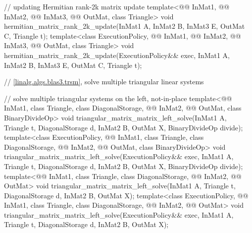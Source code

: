 \begin{codeblock}
{  // updating Hermitian rank-2k matrix update
  template<@@ InMat1, @@ InMat2, @@ InMat3,
           @@ OutMat, class Triangle>
    void hermitian_matrix_rank_2k_update(InMat1 A, InMat2 B, InMat3 E, OutMat C, Triangle t);
  template<class ExecutionPolicy,
           @@ InMat1, @@ InMat2, @@ InMat3,
           @@ OutMat, class Triangle>
    void hermitian_matrix_rank_2k_update(ExecutionPolicy&& exec,
                                         InMat1 A, InMat2 B, InMat3 E, OutMat C, Triangle t);

  // \ref{linalg.algs.blas3.trsm}, solve multiple triangular linear systems

  // solve multiple triangular systems on the left, not-in-place
  template<@@ InMat1, class Triangle, class DiagonalStorage,
           @@ InMat2, @@ OutMat, class BinaryDivideOp>
    void triangular_matrix_matrix_left_solve(InMat1 A, Triangle t, DiagonalStorage d,
                                             InMat2 B, OutMat X, BinaryDivideOp divide);
  template<class ExecutionPolicy,
           @@ InMat1, class Triangle, class DiagonalStorage,
           @@ InMat2, @@ OutMat, class BinaryDivideOp>
    void triangular_matrix_matrix_left_solve(ExecutionPolicy&& exec,
                                             InMat1 A, Triangle t, DiagonalStorage d,
                                             InMat2 B, OutMat X, BinaryDivideOp divide);
  template<@@ InMat1, class Triangle, class DiagonalStorage,
           @@ InMat2, @@ OutMat>
    void triangular_matrix_matrix_left_solve(InMat1 A, Triangle t, DiagonalStorage d,
                                             InMat2 B, OutMat X);
  template<class ExecutionPolicy,
           @@ InMat1, class Triangle, class DiagonalStorage,
           @@ InMat2, @@ OutMat>
    void triangular_matrix_matrix_left_solve(ExecutionPolicy&& exec,
                                             InMat1 A, Triangle t, DiagonalStorage d,
                                             InMat2 B, OutMat X);

}
\end{codeblock}
